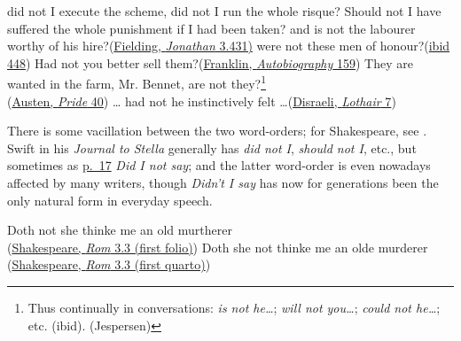 \ex
did not I execute the scheme, did not I run the whole risque? Should not I have suffered the whole punishment if I had been taken? and is not the labourer worthy of his hire?\hfill(\href{https://archive.org/details/bim_eighteenth-century_jonathan-wild-the-his_fielding-henry_1795/page/28/mode/2up?q=%22not+I+execute+the%22&view=theater}{Fielding, \textit{Jonathan} 3.431)} %
\ex
were not these men of honour?\hfill(\href{https://archive.org/details/bim_eighteenth-century_jonathan-wild-the-his_fielding-henry_1795/page/46/mode/2up?q=%22were+not+these+men%22&view=theater}{ibid 448})
\ex
Had not you better sell them?\hfill(\href{https://archive.org/details/benjaminfrautobio00franrich/page/298/mode/2up?q=%22had+not+you+better+sell%22&view=theater}{Franklin, \textit{Autobiography} 159})
\ex
They are wanted in the farm, Mr. Bennet, are not they?\footnote{Thus continually in conversations: \textit{is not he{\dots}}; \textit{will not you{\dots}}; \textit{could not he{\dots}}; etc. (ibid). \mbox{(Jespersen)}}\\ \hfill(\href{https://archive.org/details/prideprejudice00aust/page/40/mode/2up?q=%22wanted+in+the+farm%22&view=theater}{Austen, \textit{Pride} 40})
\ex \label{ex:11-18}
 {\dots} had not he instinctively felt \dots\hfill(\href{https://archive.org/details/lothairb01disr/page/n27/mode/2up?q=%22had+not+he%22&view=theater}{Disraeli, \textit{Lothair} 7}) %
\z
\z

There is some vacillation between the two word-orders; for Shakespeare, see . %
Swift in his \textit{Journal to Stella} generally has \textit{did not I}, \textit{should not I}, etc., but sometimes as \href{https://archive.org/details/journaltostellae00swifuoft/page/16/mode/2up?q=%22did+I+not+say%22&view=theater}{p.~17} \textit{Did I not say}; and the latter word-order is even nowadays affected by many writers, though \textit{Didn't I say} has now for generations been the only natural form in everyday speech.

\ea \label{ex:11-19}
\ea 
Doth not she thinke me an old murtherer\\\hfill(\href{https://internetshakespeare.uvic.ca/doc/Rom_F1/scene/3.3/index.html#tln-1910}{Shakespeare, \textit{Rom} 3.3 (first folio)}) %
\ex 
Doth she not thinke me an olde murderer\\\hfill(\href{https://internetshakespeare.uvic.ca/doc/Rom_Q1/scene/3.3/index.html#tln-1910}{Shakespeare, \textit{Rom} 3.3 (first quarto)})
\z
\z

